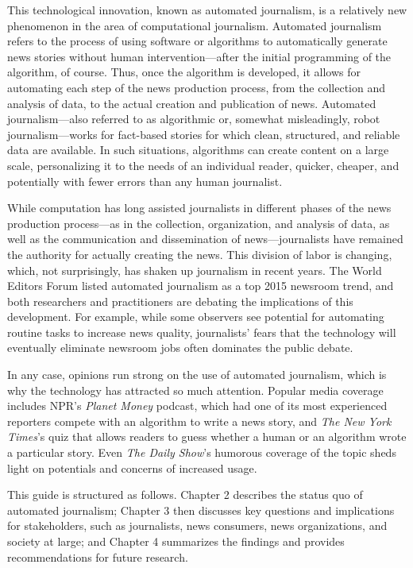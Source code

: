 \documentclass[notoc, symmetric, nobib, nols]{towcenter-book}
\begin{document}
This technological innovation, known as automated journalism, is a relatively new phenomenon in the area of computational journalism. Automated journalism refers to the process of using software or algorithms to automatically generate news stories without human intervention---after the initial programming of the algorithm, of course. Thus, once the algorithm is developed, it allows for automating each step of the news production process, from the collection and analysis of data, to the actual creation and publication of news. Automated journalism---also referred to as algorithmic\cite{doerr15} or, somewhat misleadingly, robot journalism\cite{oremus15}---works for fact-based stories for which clean, structured, and reliable data are available. In such situations, algorithms can create content on a large scale, personalizing it to the needs of an individual reader, quicker, cheaper, and potentially with fewer errors than any human journalist. 

While computation has long assisted journalists in different phases of the news production process---as in the collection, organization, and analysis of data, as well as the communication and dissemination of news---journalists have remained the authority for actually creating the news. This division of labor is changing, which, not surprisingly, has shaken up journalism in recent years. The World Editors Forum listed automated journalism as a top 2015 newsroom trend,\cite{ap15} and both researchers and practitioners are debating the implications of this development.\cite{napoli14}\cite{diak15}\cite{anderson13} For example, while some observers see potential for automating routine tasks to increase news quality, journalists’ fears that the technology will eventually eliminate newsroom jobs often dominates the public debate.\cite{dalen12}\cite{carlson15}  

In any case, opinions run strong on the use of automated journalism, which is why the technology has attracted so much attention. Popular media coverage includes NPR’s \textit{Planet Money} podcast, which had one of its most experienced reporters compete with an algorithm to write a news story,\cite{vs15} and \textit{The New York Times}’s quiz that allows readers to guess whether a human or an algorithm wrote a particular story.\cite{nyt15} Even \textit{The Daily Show}’s humorous coverage of the topic sheds light on potentials and concerns of increased usage\cite{daily15}.

This guide is structured as follows. Chapter 2 describes the status quo of automated journalism; Chapter 3 then discusses key questions and implications for stakeholders, such as journalists, news consumers, news organizations, and society at large; and Chapter 4 summarizes the findings and provides recommendations for future research.
 
\end{document}
